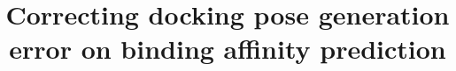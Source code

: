 \documentclass[twocolumn]{bmcart}
\begin{document}
\begin{frontmatter}

\begin{fmbox}


\title{Correcting docking pose generation error on binding affinity prediction}


\author[
   addressref={aff1},                   %
   email={jackyleehongjian@gmail.com}   %
]{ }
\author[
   addressref={aff1},                   %
   email={ksleung@cse.cuhk.edu.hk}
]{ }
\author[
   addressref={aff1},                   %
   email={mhwong@cse.cuhk.edu.hk}
]{ }
\author[
   addressref={aff2,aff3,aff4,aff5},
   corref={aff2,aff3,aff4,aff5},                      %
   email={E-Mail: pedro.ballester@inserm.fr; Tel.: +33-486-977-265; Fax: +33-486-977-499}
]{ }



\end{fmbox}
\end{frontmatter}
\end{document}
